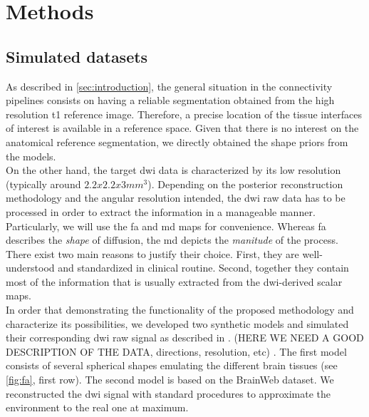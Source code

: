 \section{Methods}
\label{sec:methods}
%
\subsection{Simulated datasets}
%
As described in \autoref{sec:introduction}, the general situation in
the connectivity pipelines consists on having 
a reliable segmentation obtained from the high resolution \ac{t1} 
reference image. Therefore, a precise location of the tissue interfaces
of interest is available in a reference space. Given that there is no 
interest on the anatomical reference segmentation,
we directly obtained the shape priors from the models. \\

On the other hand, the target \ac{dwi} data is characterized by its
low resolution (typically around $2.2x2.2x3mm^3$). Depending on the
posterior reconstruction methodology and the angular resolution
intended, the \ac{dwi} raw data has to be processed in order to
extract the information in a manageable manner. Particularly, we
will use the \ac{fa} and \ac{md} maps for convenience.
Whereas \ac{fa} describes the \emph{shape} of diffusion, 
the \ac{md} depicts the \emph{manitude} of the process. 
There exist two main reasons to justify their choice. 
First, they are well-understood and standardized in clinical routine.
Second, together they contain most of the information that is
usually extracted from the \ac{dwi}-derived scalar maps. \\

In order that demonstrating the functionality of the proposed
methodology and characterize its possibilities, we developed two
synthetic models and simulated their corresponding \ac{dwi}
raw signal as described in \citep{tuch_q-ball_2004}. 
(HERE WE NEED A GOOD DESCRIPTION OF THE DATA, directions, resolution, etc)
. The first model consists of several spherical shapes emulating
the different brain tissues (see \autoref{fig:fa}, first row). 
The second model is based on the BrainWeb dataset.
We reconstructed the \ac{dwi} signal with standard procedures to approximate the
environment to the real one at maximum. \\

